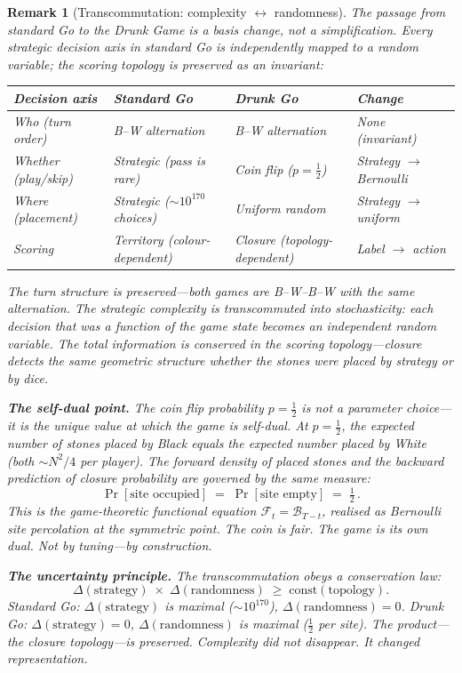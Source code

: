 \documentclass[11pt,a4paper]{article}
\newtheorem{remark}[theorem]{Remark}
\newcommand{\cF}{\mathcal{F}}
\newcommand{\cB}{\mathcal{B}}
\begin{document}
\begin{remark}[Transcommutation: complexity
  $\leftrightarrow$ randomness]%
\label{rem:transcommutation}
\color{black!60}%
The passage from standard Go to the Drunk Game is a
\emph{basis change}, not a simplification.
Every strategic decision axis in standard Go is
independently mapped to a random variable;
the scoring topology is preserved as an invariant:

\begin{center}
\small
\begin{tabular}{@{}llll@{}}
\toprule
\textbf{Decision axis} & \textbf{Standard Go} &
\textbf{Drunk Go} & \textbf{Change} \\
\midrule
Who (turn order) &
  B--W alternation &
  B--W alternation &
  None (invariant) \\
Whether (play/skip) &
  Strategic (pass is rare) &
  Coin flip ($p = \tfrac{1}{2}$) &
  Strategy $\to$ Bernoulli \\
Where (placement) &
  Strategic ($\sim\!10^{170}$ choices) &
  Uniform random &
  Strategy $\to$ uniform \\
Scoring &
  Territory (colour-dependent) &
  Closure (topology-dependent) &
  Label $\to$ action \\
\bottomrule
\end{tabular}
\end{center}

\noindent
The turn structure is \emph{preserved}---both games are
B--W--B--W with the same alternation.
The strategic complexity is \emph{transcommuted} into
stochasticity: each decision that was a function of
the game state becomes an independent random variable.
The total information is conserved in the scoring
topology---closure detects the same geometric structure
whether the stones were placed by strategy or by dice.

\medskip\noindent
\textbf{The self-dual point.}\;
The coin flip probability $p = \tfrac{1}{2}$ is not a
parameter choice---it is the unique value at which
the game is self-dual.
At $p = \tfrac{1}{2}$, the expected number of stones
placed by Black equals the expected number placed by
White (both $\sim N^2/4$ per player).
The forward density of placed stones and the backward
prediction of closure probability are governed by the
same measure:
\[
  \Pr[\text{site occupied}]
  \;=\;
  \Pr[\text{site empty}]
  \;=\;
  \tfrac{1}{2}\,.
\]
This is the game-theoretic functional equation
$\cF_t = \cB_{T-t}$, realised as Bernoulli site
percolation at the symmetric point.
The coin is fair.  The game is its own dual.
Not by tuning---by construction.

\medskip\noindent
\textbf{The uncertainty principle.}\;
The transcommutation obeys a conservation law:
\[
  \Delta(\text{strategy})
  \;\times\;
  \Delta(\text{randomness})
  \;\geq\;
  \mathrm{const}(\text{topology}).
\]
Standard Go: $\Delta(\text{strategy})$ is maximal
($\sim\!10^{170}$),
$\Delta(\text{randomness}) = 0$.
Drunk Go: $\Delta(\text{strategy}) = 0$,
$\Delta(\text{randomness})$ is maximal ($\tfrac{1}{2}$
per site).
The product---the closure topology---is preserved.
Complexity did not disappear.
It changed representation.
\end{remark}
\end{document}
